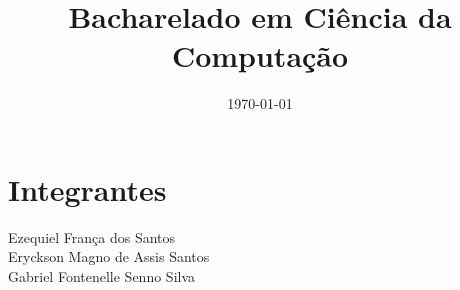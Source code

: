 \documentclass[12pt]{article}
\title{Bacharelado em Ciência da Computação}
\date{\today}
\begin{document}
\maketitle

%

\section*{Integrantes}
Ezequiel França dos Santos\\
Eryckson Magno de Assis Santos\\
Gabriel Fontenelle Senno Silva
\end{document}
